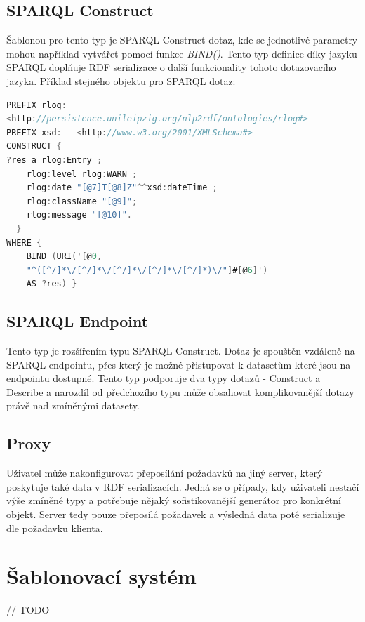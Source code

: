 \documentclass[thesis=B,czech]{FITthesis}[2012/06/26]
\begin{document}
    \subsection{SPARQL Construct}
      Šablonou pro tento typ je SPARQL Construct dotaz, kde se jednotlivé parametry mohou například vytvářet pomocí funkce \textit{BIND()}.
      Tento typ definice díky jazyku 
      SPARQL doplňuje RDF serializace o další funkcionality tohoto dotazovacího jazyka.
      Příklad stejného objektu pro SPARQL dotaz:
      
           \begin{lstlisting}[language=C, basicstyle=\small,]
PREFIX rlog:  
<http://persistence.unileipzig.org/nlp2rdf/ontologies/rlog#>
PREFIX xsd:   <http://www.w3.org/2001/XMLSchema#>
CONSTRUCT { 
?res a rlog:Entry ;
  	rlog:level rlog:WARN ;
	rlog:date "[@7]T[@8]Z"^^xsd:dateTime ;
	rlog:className "[@9]";
	rlog:message "[@10]".
  }
WHERE {
    BIND (URI('[@0, 
    "^([^/]*\/[^/]*\/[^/]*\/[^/]*\/[^/]*)\/"]#[@6]')
    AS ?res) }
\end{lstlisting}
      
      
    \subsection{SPARQL Endpoint}
      Tento typ je rozšířením typu SPARQL Construct. Dotaz je spouštěn vzdáleně na SPARQL endpointu, přes který je možné přistupovat k datasetům které jsou
      na endpointu dostupné. Tento typ podporuje dva typy dotazů - Construct a Describe a narozdíl od předchozího typu může obsahovat komplikovanější
      dotazy právě nad zmíněnými datasety.
      
    \subsection{Proxy}
      Uživatel může nakonfigurovat přeposílání požadavků na jiný server, který poskytuje také data v RDF serializacích. Jedná se o případy, kdy uživateli
      nestačí výše zmíněné typy a potřebuje nějaký sofistikovanější generátor pro konkrétní objekt. Server tedy pouze přeposílá požadavek a výsledná
      data poté serializuje dle požadavku klienta.
    
    
    
    \section{Šablonovací systém}\label{template_system}
    // TODO
    
\end{document}
